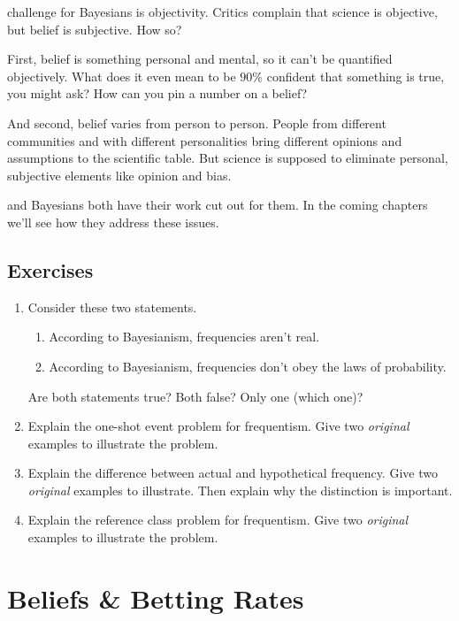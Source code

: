 \documentclass[justified]{tufte-book}
\providecommand{\tightlist}{%
  \setlength{\itemsep}{0pt}\setlength{\parskip}{0pt}}
\theoremstyle{definition}
\theoremstyle{definition}
\theoremstyle{definition}
\theoremstyle{definition}
\theoremstyle{remark}
\begin{document}
 challenge for Bayesians is objectivity. Critics complain that science is objective, but belief is subjective. How so?

First, belief is something personal and mental, so it can't be quantified objectively. What does it even mean to be \(90\%\) confident that something is true, you might ask? How can you pin a number on a belief?

And second, belief varies from person to person. People from different communities and with different personalities bring different opinions and assumptions to the scientific table. But science is supposed to eliminate personal, subjective elements like opinion and bias.

 and Bayesians both have their work cut out for them. In the coming chapters we'll see how they address these issues.

\hypertarget{exercises-13}{%
\section*{Exercises}\label{exercises-13}}

\begin{enumerate}
\item
  Consider these two statements.

  \begin{enumerate}
  \def\labelenumii{\roman{enumii}.}
  \tightlist
  \item
    According to Bayesianism, frequencies aren't real.
  \item
    According to Bayesianism, frequencies don't obey the laws of probability.
  \end{enumerate}

  Are both statements true? Both false? Only one (which one)?
\item
  Explain the one-shot event problem for frequentism. Give two \emph{original} examples to illustrate the problem.
\item
  Explain the difference between actual and hypothetical frequency. Give two \emph{original} examples to illustrate. Then explain why the distinction is important.
\item
  Explain the reference class problem for frequentism. Give two \emph{original} examples to illustrate the problem.
\end{enumerate}

\hypertarget{beliefs-betting-rates}{%
\chapter{Beliefs \& Betting Rates}\label{beliefs-betting-rates}}
\end{document}
